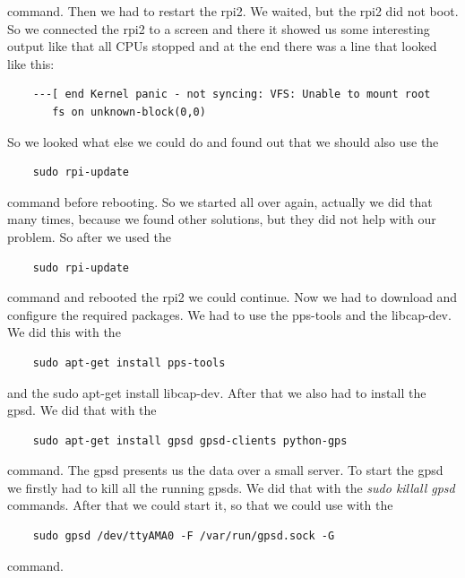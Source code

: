 command. Then we had to restart the \gls{rpi2}. We waited, but the \gls{rpi2} did not boot. So we connected the \gls{rpi2} to a screen and there it showed us some interesting output like that all CPUs stopped and at the end there was a line that looked like this: \newline
\begin{verbatim}
	---[ end Kernel panic - not syncing: VFS: Unable to mount root 
	   fs on unknown-block(0,0)
\end{verbatim}
So we looked what else we could do and found out that we should also use the 
\begin{verbatim}
	sudo rpi-update
\end{verbatim}
command before rebooting. So we started all over again, actually we did that many times, because we found other solutions, but they did not help with our problem. \newline
So after we used the 
\begin{verbatim}
	sudo rpi-update
\end{verbatim} 
command and rebooted the \gls{rpi2} we could continue.\newline
 Now we had to download and configure the required packages. We had to use the pps-tools and the libcap-dev. We did this with the 
\begin{verbatim}
	sudo apt-get install pps-tools
\end{verbatim}
and the sudo apt-get install libcap-dev. After that we also had to install the \gls{gpsd}. We did that with the
\begin{verbatim}
	sudo apt-get install gpsd gpsd-clients python-gps
\end{verbatim}
command. The gpsd presents us the data over a small server.\newline
To start the \gls{gpsd} we firstly had to kill all the running \gls{gpsd}s. We did that with the \textit{sudo killall gpsd} commands. After that we could start it, so that we could use with the 
\begin{verbatim}
	sudo gpsd /dev/ttyAMA0 -F /var/run/gpsd.sock -G
\end{verbatim}
command.

